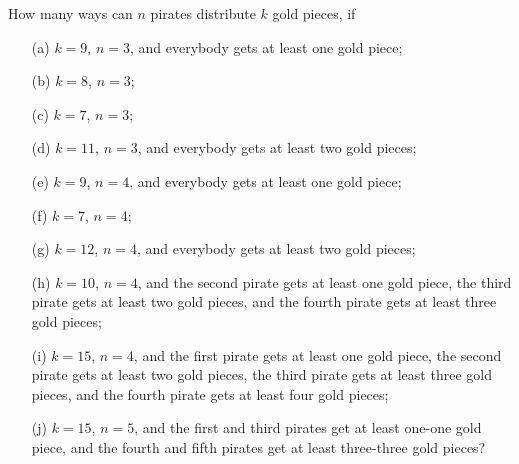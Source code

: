 \begin{exercise}\label{ex:pirates1}
How many ways can $n$ pirates distribute $k$ gold pieces, 
if 
\begin{enumerate}
\item[(a)]
$k = 9$, $n=3$, and everybody gets at least one gold piece; 
\item[(b)]
$k = 8$, $n=3$; 
\item[(c)]
$k = 7$, $n=3$; 
\item[(d)]
$k = 11$, $n=3$, and everybody gets at least two gold pieces; 
\item[(e)]
$k = 9$, $n=4$, and everybody gets at least one gold piece; 
\item[(f)]
$k = 7$, $n=4$; 
\item[(g)]
$k = 12$, $n=4$, and everybody gets at least two gold pieces; 
\item[(h)]
$k = 10$, $n=4$, and the second pirate gets at least one gold piece, 
the third pirate gets at least two gold pieces, 
and the fourth pirate gets at least three gold pieces; 
\item[(i)]
$k = 15$, $n=4$, and the first pirate gets at least one gold piece, 
the second pirate gets at least two gold pieces, 
the third pirate gets at least three gold pieces, 
and the fourth pirate gets at least four gold pieces; 
\item[(j)]
$k = 15$, $n=5$, and the first and third pirates get at least one-one gold piece, 
and the fourth and fifth pirates get at least three-three gold pieces? 
\end{enumerate}
\end{exercise}


